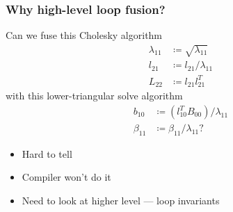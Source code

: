 \documentclass{beamer}
\begin{document}
\begin{frame}
\end{frame}

\begin{frame}
  \frametitle{Why high-level loop fusion?}
  Can we fuse this Cholesky algorithm
  \begin{align*}
    \lambda_{11} &\coloneqq \sqrt{\lambda_{11}}\\
    l_{21} &\coloneqq l_{21} / \lambda_{11}\\
    L_{22} &\coloneqq l_{21}l_{21}^T
  \end{align*}
  with this lower-triangular solve algorithm
  \begin{align*}
    b_{10} &\coloneqq (l_{10}^TB_{00})/\lambda_{11}\\
    \beta_{11} &\coloneqq \beta_{11}/\lambda_{11}?
  \end{align*}

  \begin{itemize}
  \item Hard to tell
  \item Compiler won't do it
  \item Need to look at higher level --- loop invariants
  \end{itemize}
\end{frame}
\end{document}
